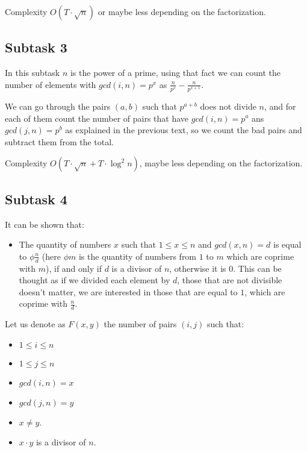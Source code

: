 Complexity \(O (T \cdot \sqrt {n})\) or maybe less depending on the
factorization.

\hypertarget{subtask-3}{%
\subsection{Subtask 3}\label{subtask-3}}

In this subtask \(n\) is the power of a prime, using that fact we can
count the number of elements with \(gcd (i, n) = p ^ x\) as
\(\frac{n}{p^x} - \frac{n}{p^{x+1}}\).

We can go through the pairs \((a, b)\) such that \(p ^ {a + b}\) does
not divide \(n\), and for each of them count the number of pairs that
have \(gcd (i, n) = p ^ a\) ans \(gcd (j, n) = p ^ b\) as explained in
the previous text, so we count the bad pairs and subtract them from the
total.

Complexity \(O(T \cdot \sqrt {n} + T \cdot \log^2 n)\), maybe less
depending on the factorization.

\hypertarget{subtask-4}{%
\subsection{Subtask 4}\label{subtask-4}}

It can be shown that:

\begin{itemize}
\tightlist
\item
  The quantity of numbers \(x\) such that \(1 \leq x \leq n\) and
  \(gcd (x, n) = d\) is equal to \(\phi {\frac {n} {d}}\) (here
  \(\phi {m}\) is the quantity of numbers from \(1\) to \(m\) which are
  coprime with \(m\)), if and only if \(d\) is a divisor of \(n\),
  otherwise it is \(0\). This can be thought as if we divided each
  element by \(d\), those that are not divisible doesn't matter, we are
  interested in those that are equal to \(1\), which are coprime with
  \(\frac{n}{d}\).
\end{itemize}

Let us denote as \(F (x, y)\) the number of pairs \((i, j)\) such that:

\begin{itemize}
\tightlist
\item
  \(1 \leq i \leq n\)
\item
  \(1 \leq j \leq n\)
\item
  \(gcd (i, n) = x\)
\item
  \(gcd (j, n) = y\)
\item
  \(x \neq y\).
\item
  \(x \cdot y\) is a divisor of \(n\).
\end{itemize}

